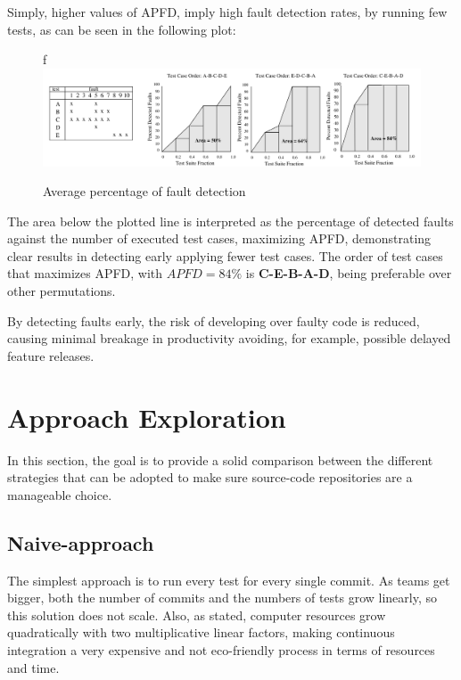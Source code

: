 Simply, higher values of APFD, imply high fault detection rates, by running few tests, as can be seen in the following plot:

\begin{figure}[h]
	\centering
f	\includegraphics[scale=0.5, width=\linewidth]{figures/APFD.png}
	\caption{Average percentage of fault detection \cite{APFD}}
	\label{APFD}
\end{figure} 

The area below the plotted line is interpreted as the percentage of detected faults against the number of executed test cases, maximizing APFD, demonstrating clear results in detecting early applying fewer test cases. The order of test cases that maximizes APFD, with $ APFD = 84 \%$ is \textbf{C-E-B-A-D}, being preferable over other permutations.

By detecting faults early, the risk of developing over faulty code is reduced, causing minimal breakage in productivity avoiding, for example, possible delayed feature releases.\cite{Uber}

\section{Approach Exploration}

In this section, the goal is to provide a solid comparison between the different strategies that can be adopted to make sure source-code repositories are a manageable choice.


\subsection{Naive-approach}

The simplest approach is to run every test for every single commit. As teams get bigger,  both the number of commits and the numbers of tests grow linearly, so this solution does not scale. Also, as \cite{Memon:2017:TGC:3103112.3103143} stated, computer resources grow quadratically with two multiplicative linear factors, making continuous integration a very expensive and not eco-friendly process in terms of resources and time.

